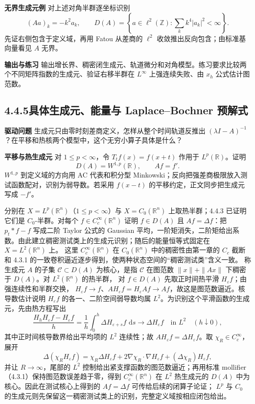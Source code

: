 \documentclass[11pt,a4paper]{ctexart}
\newcommand{\R}{\mathbb R}
\newcommand{\eps}{\varepsilon}
\newcommand{\dd}{\,\mathrm d}
\newcommand{\planitem}[1]{\par\smallskip\noindent\textcolor{deepblue}{\textbf{#1}}\quad}
\newcommand{\unithead}[2]{\subsection{#1\quad #2}}
\begin{document}
\planitem{无界生成元例}
对上述对角半群逐坐标识别
\[
(Aa)_k=-k^2a_k,\qquad
D(A)=\left\{a\in\ell^2(\mathbb Z):
\sum_kk^4|a_k|^2<\infty\right\}.
\]
先证右侧包含于定义域，再用 Fatou 从差商的 $\ell^2$ 收敛推出反向包含；由标准基向量看见 $A$ 无界。

\planitem{输出与练习}
输出增长界、稠密闭生成元、轨道微分和对角模型。练习要求比较两个不同矩阵指数的生成元、验证右移半群在 $L^\infty$ 上强连续失败、由 $x_h$ 公式估计图范数。

\unithead{4.4.5}{具体生成元、能量与 Laplace--Bochner 预解式}

\planitem{驱动问题}
生成元只由零时刻差商定义，怎样从整个时间轨道反推出 $(\lambda I-A)^{-1}$？在平移和热核两个模型中，这个无穷小算子具体是什么？

\planitem{平移与热生成元}
对 $1\le p<\infty$，令 $T_tf(x)=f(x+t)$ 作用于 $L^p(\R)$。证明
\[
D(A)=W^{1,p}(\R),\qquad Af=f'.
\]
$W^{1,p}$ 到定义域的方向用 AC 代表和积分型 Minkowski；反向把强差商极限放入测试函数配对，识别为弱导数。若采用 $f(x-t)$ 的平移约定，正文同步把生成元写成 $-f'$。

分别在 $X=L^p(\R^n)$（$1\le p<\infty$）与 $X=C_0(\R^n)$ 上取热半群；4.4.3 已证明它们是 $C_0$-半群。对每个 $f\in C_c^\infty(\R^n)$ 证明
$f\in D(A)$ 且 $Af=\Delta f$：把 $p_t*f-f$ 写成二阶 Taylor 公式的 Gaussian 平均，一阶矩消失，二阶矩给出系数。由此建立稠密测试类上的生成元识别；随后的能量恒等式固定在 $X=L^2(\R^n)$ 上。
这里 $C_c^\infty(\R^n)$ 在 $C_0(\R^n)$ 中的稠密性由第一章的 $C_c$ 截断和
4.3.1 的一致卷积逼近逐步得到，使两种状态空间的“稠密测试类”含义一致。
称生成元 $A$ 的子集 $\mathcal C\subset D(A)$ 为核心，是指
$\mathcal C$ 在图范数 $\|x\|+\|Ax\|$ 下稠密于 $D(A)$。对 $L^2(\R^n)$ 的热半群，
对 $f\in D(A)$ 先取正时间热平滑 $H_\eps f$；由强连续性和半群交换，
$H_\eps f\to f$、$AH_\eps f=H_\eps Af\to Af$，故这是图范数逼近。核导数估计说明
$H_\eps f$ 的各一、二阶空间弱导数均属 $L^2$。为识别这个平滑函数的生成元，先由热方程写出
\[
 \frac{H_hH_\eps f-H_\eps f}{h}
 =\frac1h\int_0^h\Delta H_{\eps+s}f\,\dd s
 \longrightarrow \Delta H_\eps f\quad\text{in }L^2\quad(h\downarrow0),
\]
其中正时间核导数界给出平均项的 $L^2$ 连续性；故
$AH_\eps f=\Delta H_\eps f$。取 $\chi_R\in C_c^\infty$，展开
\[
\Delta(\chi_RH_\eps f)=\chi_R\Delta H_\eps f
 +2\nabla\chi_R\cdot\nabla H_\eps f+(\Delta\chi_R)H_\eps f,
\]
并让 $R\to\infty$，尾部的 $L^2$ 控制给出紧支撑函数的图范数逼近；再用标准
mollifier（4.3.1）保持图范数误差趋于零，得到 $C_c^\infty(\R^n)$ 在 $L^2$ 热生成元的
$D(A)$ 中为核心。因此在测试核心上得到的 $Af=\Delta f$ 可传给后续的闭算子论证；
$L^p$ 与 $C_0$ 的生成元则先保留这一稠密测试类上的识别，完整定义域按相应闭包给出。
\end{document}
